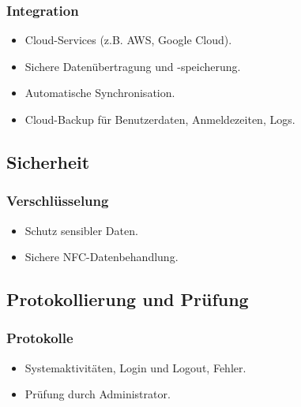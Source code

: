 \documentclass[../main.tex]{subfiles}
\begin{document}
\subsubsection{Integration}
\begin{itemize}
  \item Cloud-Services (z.B. AWS, Google Cloud).
  \item Sichere Datenübertragung und -speicherung.
  \item Automatische Synchronisation.
  \item Cloud-Backup für Benutzerdaten, Anmeldezeiten, Logs.
\end{itemize}

\subsection{Sicherheit}

\subsubsection{Verschlüsselung}
\begin{itemize}
  \item Schutz sensibler Daten.
  \item Sichere NFC-Datenbehandlung.
\end{itemize}

\subsection{Protokollierung und Prüfung}

\subsubsection{Protokolle}
\begin{itemize}
  \item Systemaktivitäten, Login und Logout, Fehler.
  \item Prüfung durch Administrator.
\end{itemize}
\end{document}
